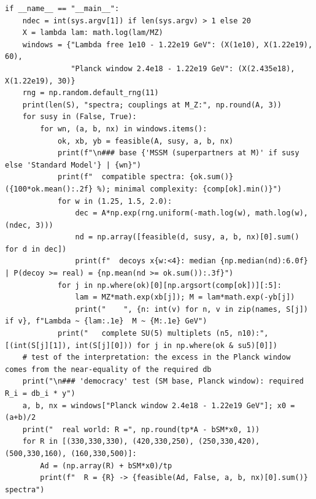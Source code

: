 \documentclass[11pt,a4paper]{article}
\begin{document}
\begin{lstlisting}
if __name__ == "__main__":
    ndec = int(sys.argv[1]) if len(sys.argv) > 1 else 20
    X = lambda lam: math.log(lam/MZ)
    windows = {"Lambda free 1e10 - 1.22e19 GeV": (X(1e10), X(1.22e19), 60),
               "Planck window 2.4e18 - 1.22e19 GeV": (X(2.435e18), X(1.22e19), 30)}
    rng = np.random.default_rng(11)
    print(len(S), "spectra; couplings at M_Z:", np.round(A, 3))
    for susy in (False, True):
        for wn, (a, b, nx) in windows.items():
            ok, xb, yb = feasible(A, susy, a, b, nx)
            print(f"\n### base {'MSSM (superpartners at M)' if susy else 'Standard Model'} | {wn}")
            print(f"  compatible spectra: {ok.sum()} ({100*ok.mean():.2f} %); minimal complexity: {comp[ok].min()}")
            for w in (1.25, 1.5, 2.0):
                dec = A*np.exp(rng.uniform(-math.log(w), math.log(w), (ndec, 3)))
                nd = np.array([feasible(d, susy, a, b, nx)[0].sum() for d in dec])
                print(f"  decoys x{w:<4}: median {np.median(nd):6.0f} | P(decoy >= real) = {np.mean(nd >= ok.sum()):.3f}")
            for j in np.where(ok)[0][np.argsort(comp[ok])][:5]:
                lam = MZ*math.exp(xb[j]); M = lam*math.exp(-yb[j])
                print("    ", {n: int(v) for n, v in zip(names, S[j]) if v}, f"Lambda ~ {lam:.1e}  M ~ {M:.1e} GeV")
            print("   complete SU(5) multiplets (n5, n10):", [(int(S[j][1]), int(S[j][0])) for j in np.where(ok & su5)[0]])
    # test of the interpretation: the excess in the Planck window comes from the near-equality of the required db
    print("\n### 'democracy' test (SM base, Planck window): required R_i = db_i * y")
    a, b, nx = windows["Planck window 2.4e18 - 1.22e19 GeV"]; x0 = (a+b)/2
    print("  real world: R =", np.round(tp*A - bSM*x0, 1))
    for R in [(330,330,330), (420,330,250), (250,330,420), (500,330,160), (160,330,500)]:
        Ad = (np.array(R) + bSM*x0)/tp
        print(f"  R = {R} -> {feasible(Ad, False, a, b, nx)[0].sum()} spectra")
\end{lstlisting}
\end{document}
